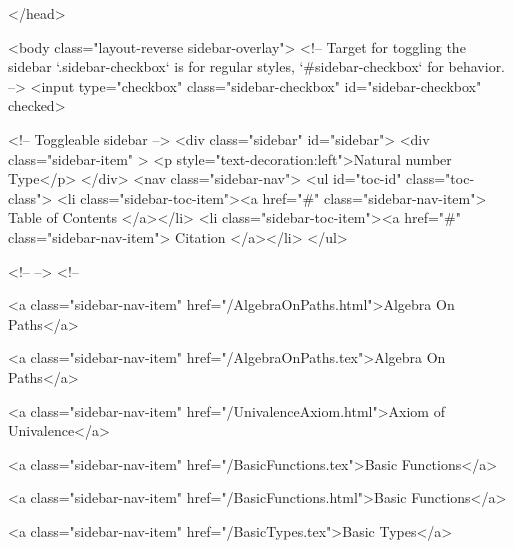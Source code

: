  
</head>




  <body class="layout-reverse sidebar-overlay">
    <!-- Target for toggling the sidebar `.sidebar-checkbox` is for regular
     styles, `#sidebar-checkbox` for behavior. -->
<input type="checkbox" class="sidebar-checkbox" id="sidebar-checkbox" checked>

<!-- Toggleable sidebar -->
<div class="sidebar" id="sidebar">
  <div class="sidebar-item" >
    <p style="text-decoration:left">Natural number Type</p>
  </div>
  <nav class="sidebar-nav">
    <ul id="toc-id" class="toc-class">
  <li class="sidebar-toc-item"><a href="#" class="sidebar-nav-item"> Table of Contents </a></li>
  <li class="sidebar-toc-item"><a href="#" class="sidebar-nav-item"> Citation </a></li>
</ul>


    <!--  -->
    <!-- 
      
    
      
    
      
    
      
        
      
    
      
        
          <a class="sidebar-nav-item" href="/AlgebraOnPaths.html">Algebra On Paths</a>
        
      
    
      
        
          <a class="sidebar-nav-item" href="/AlgebraOnPaths.tex">Algebra On Paths</a>
        
      
    
      
        
          <a class="sidebar-nav-item" href="/UnivalenceAxiom.html">Axiom of Univalence</a>
        
      
    
      
        
          <a class="sidebar-nav-item" href="/BasicFunctions.tex">Basic Functions</a>
        
      
    
      
        
          <a class="sidebar-nav-item" href="/BasicFunctions.html">Basic Functions</a>
        
      
    
      
        
          <a class="sidebar-nav-item" href="/BasicTypes.tex">Basic Types</a>
        
      
    
      
        
